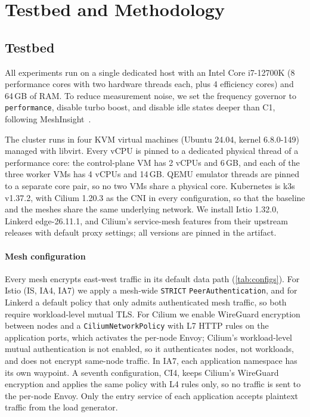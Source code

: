 \section{Testbed and Methodology}
\label{sec:method}

\subsection{Testbed}
\label{sec:testbed}

All experiments run on a single dedicated host with an Intel Core i7-12700K
(8 performance cores with two hardware threads each, plus 4 efficiency cores)
and 64\,GB of RAM. To reduce measurement noise, we set the frequency governor
to \texttt{performance}, disable turbo boost, and disable idle states deeper
than C1, following MeshInsight~\cite{zhu2023meshinsight}.

The cluster runs in four KVM virtual machines (Ubuntu 24.04, kernel
6.8.0-149) managed with libvirt. Every vCPU is pinned to a dedicated
physical thread of a performance core: the control-plane VM has 2 vCPUs and
6\,GB, and each of the three worker VMs has 4 vCPUs and 14\,GB. QEMU emulator
threads are pinned to a separate core pair, so no two VMs share a physical
core. Kubernetes is k3s v1.37.2, with Cilium 1.20.3 as the CNI in
every configuration, so that the baseline and the meshes share the same
underlying network. We install Istio 1.32.0, Linkerd
edge-26.11.1, and Cilium's service-mesh features from their upstream
releases with default proxy settings; all versions are pinned in the
artifact.

\paragraph{Mesh configuration}
Every mesh encrypts east-west traffic in its default data path
(\cref{tab:configs}). For Istio (IS, IA4, IA7) we apply a mesh-wide
\texttt{STRICT} \texttt{PeerAuthentication}, and for Linkerd a default policy
that only admits authenticated mesh traffic, so both require workload-level
mutual TLS. For Cilium we enable WireGuard encryption between nodes and a
\texttt{CiliumNetworkPolicy} with L7 HTTP rules on the application ports,
which activates the per-node Envoy; Cilium's workload-level mutual
authentication is not enabled, so it authenticates nodes, not workloads, and
does not encrypt same-node traffic. In IA7, each application namespace has its
own waypoint. A seventh configuration, CI4, keeps Cilium's WireGuard
encryption and applies the same policy with L4 rules only, so no traffic is
sent to the per-node Envoy. Only the entry service of each application
accepts plaintext traffic from the load generator.

